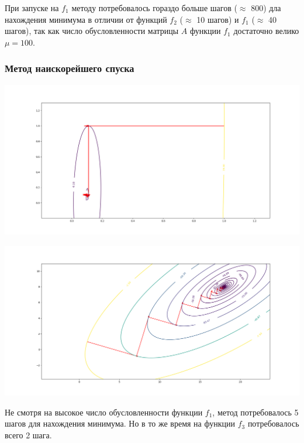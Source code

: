 \documentclass[english]{article}
\begin{document}
При запуске на \(f_1\) методу потребовалось гораздо больше шагов
(\(\approx\) 800) дла нахождения минимума в отличии от функций \(f_2\)
(\(\approx\) 10 шагов) и \(f_1\) (\(\approx\) 40 шагов), так как число
обусловленности матрицы \(A\) функции \(f_1\) достаточно велико \(\mu
= 100\).
\subsubsection{Метод наискорейшего спуска}
\begin{center}
  \includegraphics[scale=0.3]{plots/traectories/steepest_descent_1.png}
\end{center}
\begin{center}
  \includegraphics[scale=0.3]{plots/traectories/steepest_descent_3.png}
\end{center}

Не смотря на высокое число обусловленности функции \(f_1\), метод
потребовалось 5 шагов для нахождения минимума. Но в то же время на
функции \(f_3\) потребовалось всего 2 шага.
\end{document}
